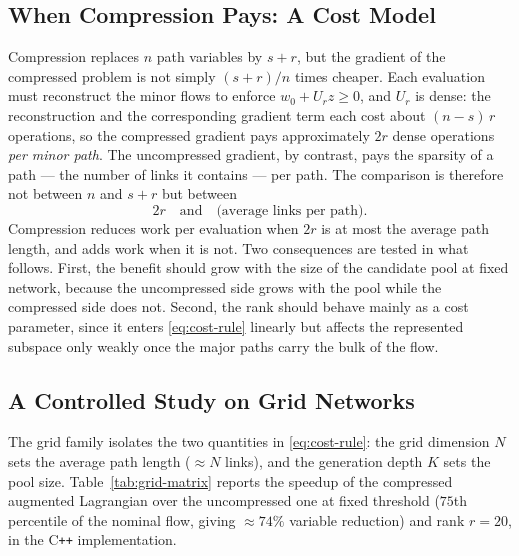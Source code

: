 \documentclass[11pt]{article}
\newif\ifshownotes \shownotesfalse
\newcommand{\conote}[1]{\ifshownotes{\color{red}\small\textsf{[Note to co-authors: #1]}}\fi}
\begin{document}
\conote{Two accounting decisions are ours to make before submission. (i) None of the reported
speedups charge the SVD or the nominal-flow computation; Referee~1 objected to exactly this
and the objection is currently unanswered. Proposal: report every ratio twice, online-only and
fully charged, with a break-even count in related solves. (ii) Large-instance timings are
single runs at $\pm40\%$; medians of three would cost roughly two machine-hours and would let
the near-parity entries be read as ordered.}


\subsection{When Compression Pays: A Cost Model}
\label{sec:cost-model}


Compression replaces $n$ path variables by $s+r$, but the gradient of the compressed problem
is not simply $(s+r)/n$ times cheaper. Each evaluation must reconstruct the minor flows to
enforce $w_0+U_rz\ge 0$, and $U_r$ is dense: the reconstruction and the corresponding
gradient term each cost about $(n-s)\,r$ operations, so the compressed gradient pays
approximately $2r$ dense operations \emph{per minor path}. The uncompressed gradient, by
contrast, pays the sparsity of a path --- the number of links it contains --- per path. The
comparison is therefore not between $n$ and $s+r$ but between
\begin{equation}
\label{eq:cost-rule}
2r \quad\text{and}\quad \text{(average links per path)} .
\end{equation}
Compression reduces work per evaluation when $2r$ is at most the average path length, and
adds work when it is not. Two consequences are tested in what follows. First, the benefit
should grow with the size of the candidate pool at fixed network, because the uncompressed
side grows with the pool while the compressed side does not. Second, the rank should behave
mainly as a cost parameter, since it enters \eqref{eq:cost-rule} linearly but affects the
represented subspace only weakly once the major paths carry the bulk of the flow.


\subsection{A Controlled Study on Grid Networks}
\label{sec:grid-study}


The grid family isolates the two quantities in \eqref{eq:cost-rule}: the grid dimension $N$
sets the average path length ($\approx N$ links), and the generation depth $K$ sets the pool
size. Table~\ref{tab:grid-matrix} reports the speedup of the compressed augmented Lagrangian
over the uncompressed one at fixed threshold ($75$th percentile of the nominal flow, giving
$\approx 74\%$ variable reduction) and rank $r=20$, in the C\texttt{++} implementation.
\end{document}

